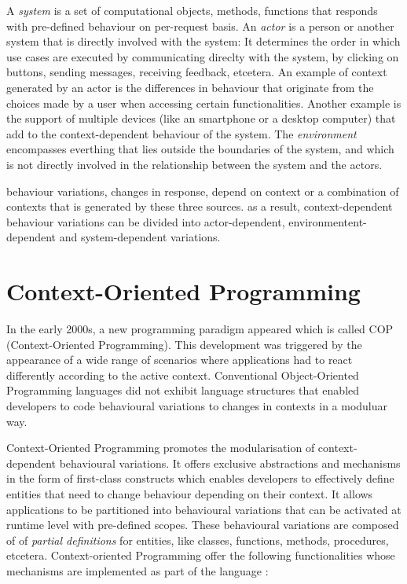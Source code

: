 \documentclass{acm_proc_article-sp}
\begin{document}
A \textit{system} is a set of computational objects, methods, functions that responds with pre-defined behaviour on per-request basis. An \textit{actor} is a person or another system that is directly involved with the system: It determines the order in which use cases are executed by communicating direclty with the system, by clicking on buttons, sending messages, receiving feedback, etcetera. An example of context generated by an actor is the differences in behaviour that originate from the choices made by a user when accessing certain functionalities. Another example is the support of multiple devices (like an smartphone or a desktop computer) that add to the context-dependent behaviour of the system. The \textit{environment} encompasses everthing that lies outside the boundaries of the system, and which is not directly involved in the relationship between the system and the actors.

behaviour variations, changes in response, depend on context or a combination of contexts that is generated by these three sources. as a result, context-dependent behaviour variations can be divided into actor-dependent, environmentent-dependent and system-dependent variations.

\section{Context-Oriented Programming}\label{cop}
In the early 2000s, a new programming paradigm appeared which is called COP (Context-Oriented Programming). This development was triggered by the appearance of a wide range of scenarios where applications had to react differently according to the active context. Conventional Object-Oriented Programming languages did not exhibit language structures that enabled developers to code behavioural variations to changes in contexts in a moduluar way. 

Context-Oriented Programming promotes the modularisation of context-dependent behavioural variations. It offers exclusive abstractions and mechanisms in the form of first-class constructs which enables developers to effectively define entities that need to change behaviour depending on their context. It allows applications to be partitioned into behavioural variations that can be activated at runtime level with pre-defined scopes. These behavioural variations are composed of of \textit{partial definitions} for entities, like classes, functions, methods, procedures, etcetera. Context-oriented Programming offer the following functionalities whose mechanisms are implemented as part of the language \cite{Costanza:2008:CPC:1529966.1529970}:
\end{document}
